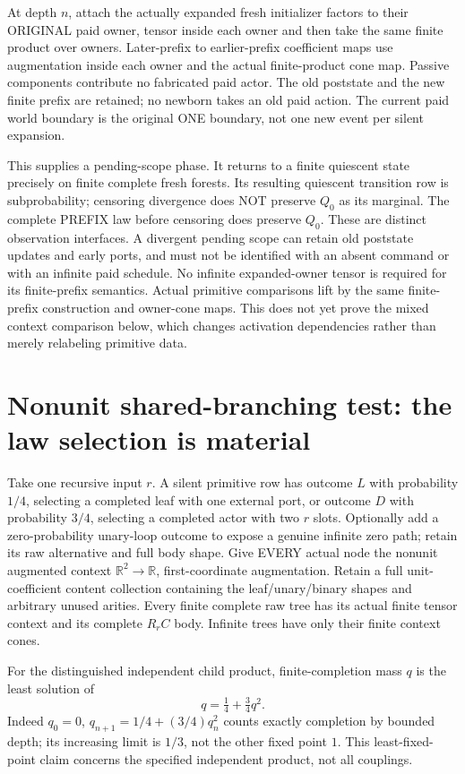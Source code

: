 \documentclass[11pt]{article}
\begin{document}
At depth $n$, attach the actually expanded fresh initializer factors to their ORIGINAL paid owner, tensor inside each owner and then take the same finite product over owners. Later-prefix to earlier-prefix coefficient maps use augmentation inside each owner and the actual finite-product cone map. Passive components contribute no fabricated paid actor. The old poststate and the new finite prefix are retained; no newborn takes an old paid action. The current paid world boundary is the original ONE boundary, not one new event per silent expansion.

This supplies a pending-scope phase. It returns to a finite quiescent state precisely on finite complete fresh forests. Its resulting quiescent transition row is subprobability; censoring divergence does NOT preserve $Q_0$ as its marginal. The complete PREFIX law before censoring does preserve $Q_0$. These are distinct observation interfaces. A divergent pending scope can retain old poststate updates and early ports, and must not be identified with an absent command or with an infinite paid schedule. No infinite expanded-owner tensor is required for its finite-prefix semantics. Actual primitive comparisons lift by the same finite-prefix construction and owner-cone maps. This does not yet prove the mixed context comparison below, which changes activation dependencies rather than merely relabeling primitive data.

\section{Nonunit shared-branching test: the law selection is material}
Take one recursive input $r$. A silent primitive row has outcome $L$ with probability $1/4$, selecting a completed leaf with one external port, or outcome $D$ with probability $3/4$, selecting a completed actor with two $r$ slots. Optionally add a zero-probability unary-loop outcome to expose a genuine infinite zero path; retain its raw alternative and full body shape. Give EVERY actual node the nonunit augmented context $\mathbb R^2\to\mathbb R$, first-coordinate augmentation. Retain a full unit-coefficient content collection containing the leaf/unary/binary shapes and arbitrary unused arities. Every finite complete raw tree has its actual finite tensor context and its complete $R_rC$ body. Infinite trees have only their finite context cones.

For the distinguished independent child product, finite-completion mass $q$ is the least solution of
\[
       q=\tfrac14+\tfrac34q^2.
\]
Indeed $q_0=0$, $q_{n+1}=1/4+(3/4)q_n^2$ counts exactly completion by bounded depth; its increasing limit is $1/3$, not the other fixed point $1$. This least-fixed-point claim concerns the specified independent product, not all couplings.
\end{document}
